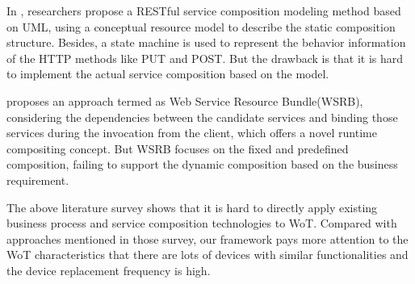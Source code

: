 In \cite{rauf2010modeling}, researchers propose a RESTful service composition modeling method based on UML, using a conceptual resource model to describe the static composition structure. Besides, a state machine is used to represent the behavior information of the HTTP methods like PUT and POST. But the drawback is that it is hard to implement the actual service composition based on the model. 

\cite{rathod2015towards} proposes an approach termed as Web Service Resource Bundle(WSRB), considering the dependencies between the candidate services and binding those services during the invocation from the client, which offers a novel runtime compositing concept. But WSRB focuses on the fixed and predefined composition, failing to support the dynamic composition based on the business requirement. 

The above literature survey shows that it is hard to directly apply existing business process and service composition technologies to WoT. Compared with approaches mentioned in those survey, our framework pays more attention to the WoT characteristics that there are lots of devices with similar functionalities and the device replacement frequency is high. 